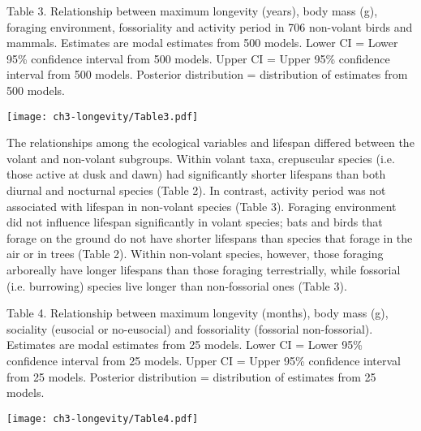 \begin{table}[H]
  \caption[ ]{Table 3. Relationship between maximum longevity (years), body mass (g), foraging environment, fossoriality and activity period in 706 non-volant birds and mammals. Estimates are modal estimates from 500 models. Lower CI = Lower 95\% confidence interval from 500 models. Upper CI = Upper 95\% confidence interval from 500 models. Posterior distribution = distribution of estimates from 500 models.}
  \label{tbl:Table 3.}
  \texttt{[image: ch3-longevity/Table3.pdf]}
\end{table}


The relationships among the ecological variables and lifespan differed between the volant and non-volant subgroups. Within volant taxa, crepuscular species (i.e. those active at dusk and dawn) had significantly shorter lifespans than both diurnal and nocturnal species (Table 2). In contrast, activity period was not associated with lifespan in non-volant species (Table 3). Foraging environment did not influence lifespan significantly in volant species; bats and birds that forage on the ground do not have shorter lifespans than species that forage in the air or in trees (Table 2). Within non-volant species, however, those foraging arboreally have longer lifespans than those foraging terrestrially, while fossorial (i.e. burrowing) species live longer than non-fossorial ones (Table 3).

\vspace{10 mm}

\begin{table}[H]
  \caption[ ]{Table 4. Relationship between maximum longevity (months), body mass (g), sociality (eusocial or no-eusocial) and fossoriality (fossorial non-fossorial). Estimates are modal estimates from 25 models. Lower CI = Lower 95\% confidence interval from 25 models. Upper CI = Upper 95\% confidence interval from 25 models. Posterior distribution = distribution of estimates from 25 models.}
  \label{tbl:Table 4.}
  \texttt{[image: ch3-longevity/Table4.pdf]}
\end{table}



